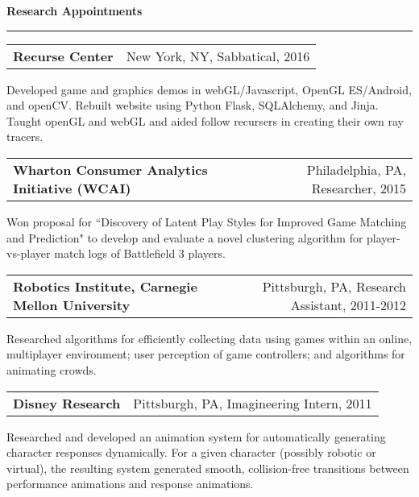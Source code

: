 \needspace{6em}
{\Large {\bf Research Appointments}} 
\vspace{0.1cm}
\hrule
\medskip

\needspace{6em}
\begin{tabular*}{7.1in}{@{}l@{\extracolsep\fill}r}
{\large {\bf Recurse Center}} & New York, NY, Sabbatical, 2016\\
\end{tabular*}
Developed game and graphics demos in webGL/Javascript, OpenGL ES/Android, and openCV. Rebuilt website using Python Flask, SQLAlchemy, and Jinja. Taught openGL and webGL and aided follow recursers in creating their own ray tracers.

\medskip


\needspace{6em}
\begin{tabular*}{7.1in}{@{}l@{\extracolsep\fill}r}
   {\large {\bf Wharton Consumer Analytics Initiative (WCAI)}} & Philadelphia, PA, Researcher, 2015\\
\end{tabular*}

Won proposal for ``Discovery of Latent Play Styles for Improved Game Matching and Prediction" to develop and evaluate a novel clustering algorithm for player-vs-player match logs of Battlefield 3 players.

\medskip


\needspace{6em}
\begin{tabular*}{7.1in}{@{}l@{\extracolsep\fill}r}
{\large {\bf Robotics Institute, Carnegie Mellon University}} & Pittsburgh, PA, Research Assistant, 2011-2012\\
\end{tabular*}

Researched algorithms for efficiently collecting data using games within an online, multiplayer environment; user perception of game controllers; and algorithms for animating crowds. 
\medskip

\needspace{6em}
\begin{tabular*}{7.1in}{@{}l@{\extracolsep\fill}r}
{\large {\bf Disney Research}} & Pittsburgh, PA, Imagineering Intern, 2011\\
\end{tabular*}

Researched and developed an animation system for automatically generating character responses dynamically. 
For a given character (possibly robotic or virtual), the resulting system generated 
smooth, collision-free transitions between performance animations and response animations.


